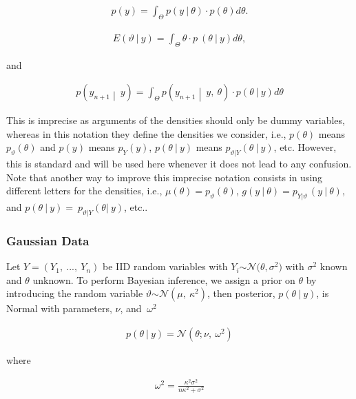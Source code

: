 \begin{align}p(y) = \int_{\Theta}^{}{p(y\ |\ \theta) \cdot p(\theta)}d\theta.\end{align}

\begin{align}E(\vartheta\ |\ y) = \int_{\Theta}^{}{\theta \cdot p\ (\theta\ |\ y)}d\theta,\end{align}

and

\begin{align}p\left( y_{n + 1} \middle| \ y \right) = \int_{\Theta}^{}{p\left( y_{n + 1} \middle| \ y,\ \theta \right) \cdot p(\theta\ |\ y)}d\theta\end{align}

This is imprecise as arguments of the densities should only be dummy
variables, whereas in this notation they deﬁne the densities we
consider, i.e., \(p(\theta)\) means \(p_{\vartheta}(\theta)\) and
\(p(y)\) means \(p_{Y}(y)\), \(p(\theta\ |\ y)\) means
\(p_{\vartheta|Y}(\theta\ |\ y)\), etc. However, this is standard and
will be used here whenever it does not lead to any confusion. Note that
another way to improve this imprecise notation consists in using
diﬀerent letters for the densities, i.e.,
\(\mu(\theta) = p_{\vartheta}(\theta)\),
\(g(y\ |\ \theta) = p_{Y|\vartheta\ }(y\ |\ \theta)\), and
\(p(\theta\ |\ y) = \ p_{\vartheta|Y}(\theta|\ y)\), etc..

\subsubsection{Gaussian Data}\label{gaussian-data}

Let \(Y = \left( Y_{1},\ ...,\ Y_{n} \right)\) be IID random variables
with \(Y_{i}\mathcal{\sim N(}\theta,\sigma^{2})\) with \(\sigma^{2}\)
known and \(\theta\) unknown. To perform Bayesian inference, we assign a
prior on \(\theta\) by introducing the random variable
\(\vartheta\mathcal{\sim N}(\mu,\ \kappa^{2})\), then posterior,
\(p(\theta\ |\ y)\), is Normal with parameters, \(\nu\), and
\(\ \omega^{2}\)

\begin{align}p(\theta\ |\ y) = \mathcal{N}\left( \theta;\nu,\ \omega^{2} \right)\end{align}

where

\begin{align}\omega^{2} = \frac{\kappa^{2}\sigma^{2}}{n\kappa^{2} + \sigma^{2}}\end{align}

